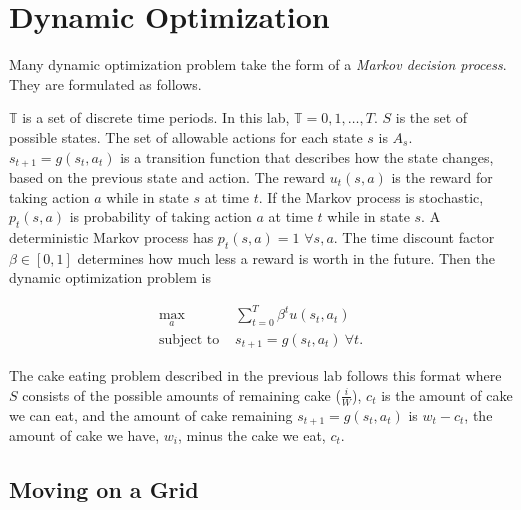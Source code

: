
\section*{Dynamic Optimization}

Many dynamic optimization problem take the form of a \emph{Markov decision process}.
They are formulated as follows.

$\mathbb{T}$ is a set of discrete time periods.
In this lab, $\mathbb{T} = {0,1,\ldots, T}$.
$S$ is the set of possible states.
The set of allowable actions for each state $s$ is $A_s$.
$s_{t+1}=g(s_t,a_t)$ is a transition function that describes how the state changes, based on the previous state and action.
The reward $u_t(s,a)$ is the reward for taking action $a$ while in state $s$ at time $t$.
If the Markov process is stochastic, $p_t(s,a)$ is probability of taking action $a$ at time $t$ while in state $s$.
A deterministic Markov process has $p_t(s,a) = 1$ $\forall s,a$.
The time discount factor $\beta \in [0,1]$ determines how much less a reward is worth in the future.
Then the dynamic optimization problem is

\begin{align*}
\label{eq:policyiter-dynopt1}
\max_a  & \sum_{t=0}^T \beta^t u(s_t,a_t) \\
\mbox{subject to } & s_{t+1}= g(s_t,a_t)\ \forall t.
\end{align*}

The cake eating problem described in the previous lab follows this format where $S$ consists of the possible amounts of remaining cake ($\frac{i}{W}$), $c_t$ is the amount of cake we can eat, and the amount of cake remaining $s_{t+1}=g(s_t,a_t)$ is $w_t-c_t$, the amount of cake we have, $w_i$, minus the cake we eat, $c_t$.


\subsection*{Moving on a Grid}

